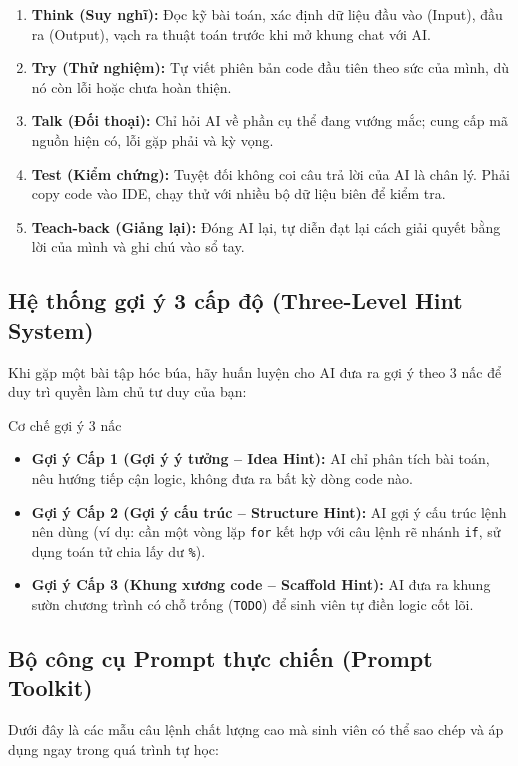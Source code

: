 \documentclass[11pt,a4paper]{article}
\begin{document}
\begin{enumerate}[leftmargin=1.5em, itemsep=3pt]
    \item \textbf{Think (Suy nghĩ):} Đọc kỹ bài toán, xác định dữ liệu đầu vào (Input), đầu ra (Output), vạch ra thuật toán trước khi mở khung chat với AI.
    \item \textbf{Try (Thử nghiệm):} Tự viết phiên bản code đầu tiên theo sức của mình, dù nó còn lỗi hoặc chưa hoàn thiện.
    \item \textbf{Talk (Đối thoại):} Chỉ hỏi AI về phần cụ thể đang vướng mắc; cung cấp mã nguồn hiện có, lỗi gặp phải và kỳ vọng.
    \item \textbf{Test (Kiểm chứng):} Tuyệt đối không coi câu trả lời của AI là chân lý. Phải copy code vào IDE, chạy thử với nhiều bộ dữ liệu biên để kiểm tra.
    \item \textbf{Teach-back (Giảng lại):} Đóng AI lại, tự diễn đạt lại cách giải quyết bằng lời của mình và ghi chú vào sổ tay.
\end{enumerate}

\subsection{Hệ thống gợi ý 3 cấp độ (Three-Level Hint System)}
Khi gặp một bài tập hóc búa, hãy huấn luyện cho AI đưa ra gợi ý theo 3 nấc để duy trì quyền làm chủ tư duy của bạn:

\begin{infobox}{Cơ chế gợi ý 3 nấc}
\begin{itemize}[leftmargin=1.5em, itemsep=3pt]
    \item \textbf{Gợi ý Cấp 1 (Gợi ý ý tưởng -- Idea Hint):} AI chỉ phân tích bài toán, nêu hướng tiếp cận logic, không đưa ra bất kỳ dòng code nào.
    \item \textbf{Gợi ý Cấp 2 (Gợi ý cấu trúc -- Structure Hint):} AI gợi ý cấu trúc lệnh nên dùng (ví dụ: cần một vòng lặp \texttt{for} kết hợp với câu lệnh rẽ nhánh \texttt{if}, sử dụng toán tử chia lấy dư \texttt{\%}).
    \item \textbf{Gợi ý Cấp 3 (Khung xương code -- Scaffold Hint):} AI đưa ra khung sườn chương trình có chỗ trống (\texttt{TODO}) để sinh viên tự điền logic cốt lõi.
\end{itemize}
\end{infobox}

\subsection{Bộ công cụ Prompt thực chiến (Prompt Toolkit)}
Dưới đây là các mẫu câu lệnh chất lượng cao mà sinh viên có thể sao chép và áp dụng ngay trong quá trình tự học:
\end{document}
